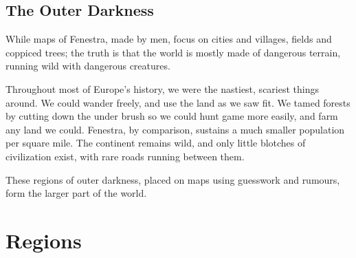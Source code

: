 \begin{multicols}{2}
\subsection{The Outer Darkness}

While maps of Fenestra, made by men, focus on cities and villages, fields and coppiced trees; the truth is that the world is mostly made of dangerous terrain, running wild with dangerous creatures.

Throughout most of Europe's history, we were the nastiest, scariest things around.
We could wander freely, and use the land as we saw fit.
We tamed forests by cutting down the under brush so we could hunt game more easily, and farm any land we could.
Fenestra, by comparison, sustains a much smaller population per square mile.
The continent remains wild, and only little blotches of civilization exist, with rare roads running between them.

These regions of outer darkness, placed on maps using guesswork and rumours, form the larger part of the world.


\end{multicols}

\section{Regions}
\label{regionEncounters}

